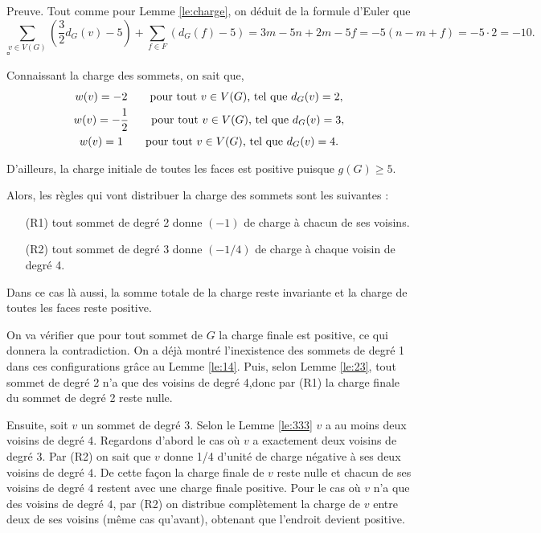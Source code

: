 \documentclass[10pt,a4paper]{article}
\newcommand{\ep}{{\hfill $\square$}}
\begin{document}
Preuve.
Tout comme pour Lemme \ref{le:charge}, on déduit de la formule d'Euler que
$$ 
\sum_{v \in V(G)} \left(\frac{3}{2}d_G(v) - 5\right) + \sum_{f\in F} \left(d_G(f) -5\right) = 3m -5n + 2m - 5f = -5(n - m + f) = -5 \cdot 2 = -10.
$$
\ep 

Connaissant la charge des sommets, on sait que,
$$
\gathered
w(v) = -2 \qquad \textrm{pour tout $v \in V(G)$, tel que } d_G(v) = 2,\\
w(v) = -\frac{1}{2} \qquad \textrm{pour tout $v \in V(G)$, tel que } d_G(v) = 3,\\
w(v) =  1 \qquad \textrm{pour tout $v \in V(G)$, tel que } d_G(v) = 4.
\endgathered
$$

D'ailleurs, la charge initiale de toutes les faces est positive puisque $g(G) \geq 5$.

Alors, les règles qui vont distribuer la charge des sommets sont les suivantes :

\begin{enumerate}
\item[(R1)] tout sommet de degré 2 donne $(-1)$ de charge à chacun de ses voisins.
\item[(R2)] tout sommet de degré 3 donne $(-1/4)$ de charge à chaque voisin de degré 4.
\end{enumerate}
Dans ce cas là aussi, la somme totale de la charge reste invariante et la charge de toutes les faces reste positive.

On va vérifier que pour tout sommet de $G$ la charge finale est positive, ce qui donnera la contradiction. On a déjà montré l'inexistence des sommets de degré 1 dans ces configurations grâce au Lemme \ref{le:14}. Puis, selon Lemme \ref{le:23}, tout sommet de degré 2 n'a que des voisins de degré 4,donc par (R1) la charge finale du sommet de degré 2 reste nulle.

Ensuite, soit $v$ un sommet de degré $3$. Selon le Lemme \ref{le:333} $v$ a au moins deux voisins de degré $4$. Regardons d'abord le cas où $v$ a exactement deux voisins de degré $3$. Par (R2) on sait que $v$ donne 1/4 d'unité de charge négative à ses deux voisins de degré $4$. De cette façon la charge finale de $v$ reste nulle et chacun de ses voisins de degré $4$ restent avec une charge finale positive. Pour le cas où $v$ n'a que des voisins de degré $4$, par (R2) on distribue complètement la charge de $v$ entre deux de ses voisins (même cas qu'avant), obtenant que l'endroit devient positive.

\end{document}
